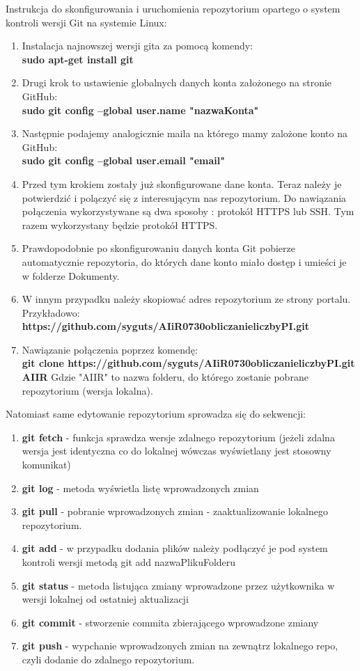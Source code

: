 \documentclass[a4paper,12pt]{article}		%
\begin{document}
Instrukcja do skonfigurowania i uruchomienia repozytorium opartego o system kontroli wersji Git na systemie Linux:

\begin{enumerate}
\item Instalacja najnowszej wersji gita za pomocą komendy:\\
\textbf{sudo apt-get install git}
\item Drugi krok to ustawienie globalnych danych konta założonego na stronie GitHub:\\
\textbf{sudo git config --global user.name "nazwaKonta" }
\item Następnie podajemy analogicznie maila na którego mamy zalożone konto na GitHub:\\
\textbf{sudo git config --global user.email "email"}
\item Przed tym krokiem zostały już skonfigurowane dane konta.  Teraz należy je potwierdzić i polączyć się z interesującym nas repozytorium. Do nawiązania połączenia wykorzystywane są dwa sposoby : protokół HTTPS lub SSH. Tym razem wykorzystany będzie protokół HTTPS.
\item Prawdopodobnie po skonfigurowaniu danych konta Git pobierze automatycznie repozytoria, do których dane konto miało dostęp i umieści je w folderze Dokumenty.
\item W innym przypadku należy skopiować adres repozytorium ze strony portalu. Przykładowo:\\
\textbf{https://github.com/syguts/AIiR0730obliczanieliczbyPI.git}
\item Nawiązanie połączenia poprzez komendę:\\
\textbf{git clone https://github.com/syguts/AIiR0730obliczanieliczbyPI.git AIIR}
Gdzie "AIIR" to nazwa folderu, do którego zostanie pobrane repozytorium (wersja lokalna).
\end{enumerate}

Natomiast same edytowanie repozytorium sprowadza się do sekwencji:
\begin{enumerate}
\item \textbf{git fetch} - funkcja sprawdza wersje zdalnego repozytorium (jeżeli zdalna wersja jest identyczna co do lokalnej wówczas wyświetlany jest stosowny komunikat)
\item \textbf{git log} - metoda wyświetla listę wprowadzonych zmian
\item \textbf{git pull} - pobranie wprowadzonych zmian - zaaktualizowanie lokalnego repozytorium.
\item \textbf{git add} -  w przypadku dodania plików należy podłączyć je pod system kontroli wersji metodą git add nazwaPlikuFolderu
\item \textbf{git status} - metoda listująca zmiany wprowadzone przez użytkownika w wersji lokalnej od ostatniej aktualizacji
\item \textbf{git commit} - stworzenie commita zbierającego wprowadzone zmiany
\item \textbf{git push} - wypchanie wprowadzonych zmian na zewnątrz lokalnego repo, czyli dodanie do zdalnego repozytorium.
\end{enumerate}
\end{document}
